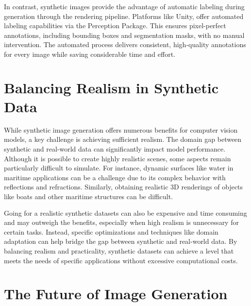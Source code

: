 In contrast, synthetic images provide the advantage of automatic labeling during generation through the rendering pipeline. Platforms like Unity, offer automated labeling capabilities via the Perception Package. \cite{unity-perception2022} This ensures pixel-perfect annotations, including bounding boxes and segmentation masks, with no manual intervention. The automated process delivers consistent, high-quality annotations for every image while saving considerable time and effort.


\section{Balancing Realism in Synthetic Data}
While synthetic image generation offers numerous benefits for computer vision models, a key challenge is achieving sufficient realism. The domain gap between synthetic and real-world data can significantly impact model performance.\cite{nikolenko2021synthetic}  Although it is possible to create highly realistic scenes, some aspects remain particularly difficult to simulate. For instance, dynamic surfaces like water in maritime applications can be a challenge due to its complex behavior with reflections and refractions. \cite{waterrendering} Similarly, obtaining realistic 3D renderings of objects like boats and other maritime structures can be difficult.

Going for a realistic synthetic datasets can also be expensive and time consuming and may outweigh the benefits, especially when high realism is unnecessary for certain tasks. Instead, specific optimizations and techniques like domain adaptation can help bridge the gap between synthetic and real-world data. \cite{nikolenko2021synthetic, jimaging8110310} By balancing realism and practicality, synthetic datasets can achieve a level that meets the needs of specific applications without excessive computational costs.


\section{The Future of Image Generation}

